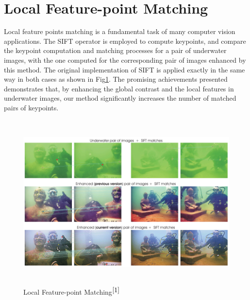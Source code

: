 \documentclass[hidelinks, 12pt]{report}
\begin{document}
\section{Local Feature-point Matching}
Local feature points matching is a fundamental task of many computer vision applications. The SIFT operator is employed to compute keypoints, and compare the keypoint computation and matching processes for a pair of underwater images, with the one computed for the corresponding pair of images enhanced by this method. The original implementation of SIFT is applied exactly in the same way in both cases as shown in Fig\ref{Matching}. The promising achievements presented demonstrates that, by enhancing the global contrast and the local features in underwater images, our method significantly increases the number of matched pairs of keypoints.
\begin{figure}[H]
\centering
\includegraphics[width=15cm,height=9cm]{Feature.png}
\caption[Local Feature-point Matching]{Local Feature-point Matching$^{\cite{1}}$}
\label{Matching}
\end{figure}
\end{document}
